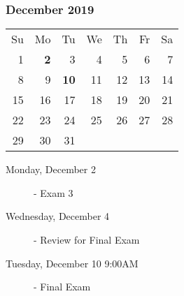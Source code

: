 \documentclass[11pt]{article}
\begin{document}
\subsubsection*{December 2019}
\begin{tabular}{rrrrrrr}
Su & Mo & Tu & We & Th & Fr & Sa\\
 1 &  {\bf 2} &  3 &  4 &  5 &  6 &  7\\
 8 &  9 & {\bf 10} & 11 & 12 & 13 & 14\\
15 & 16 & 17 & 18 & 19 & 20 & 21\\
22 & 23 & 24 & 25 & 26 & 27 & 28\\
29 & 30 & 31 &    &    &    &   \\
\end{tabular}
\begin{description}
\item[Monday, December 2]
  - Exam 3
\item[Wednesday, December 4]
  - Review for Final Exam
\item[Tuesday, December 10 9:00AM] 
  - Final Exam
\end{description}

\hrulefill
\end{document}
